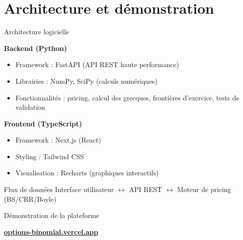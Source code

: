 \documentclass[aspectratio=169]{beamer}
\begin{document}
\section{Architecture et démonstration}

\begin{frame}{Architecture logicielle}
  \small
  
  \vspace{5mm}
  
  \textbf{Backend (Python)}
  \begin{itemize}\scriptsize
    \item Framework : FastAPI (API REST haute performance)
    \item Librairies : NumPy, SciPy (calculs numériques)
    \item Fonctionnalités : pricing, calcul des grecques, frontières d'exercice, tests de validation
  \end{itemize}
  
  \vspace{-1.5mm}
  \textbf{Frontend (TypeScript)}
  \begin{itemize}\scriptsize
    \item Framework : Next.js (React)
    \item Styling : Tailwind CSS
    \item Visualisation : Recharts (graphiques interactifs)
  \end{itemize}

  
  \vspace{-1.5mm}
  \begin{keybox}{Flux de données}
    \scriptsize
    Interface utilisateur $\leftrightarrow$ API REST $\leftrightarrow$ Moteur de pricing (BS/CRR/Boyle)
  \end{keybox}
\end{frame}

\begin{frame}{Démonstration de la plateforme}
  \small
  \begin{center}
      \vspace{15mm}
        {\huge \href{https://options-binomial.vercel.app}{\textcolor{Secondary}{\textbf{options-binomial.vercel.app}}}}
  \end{center}
\end{frame}

\end{document}
